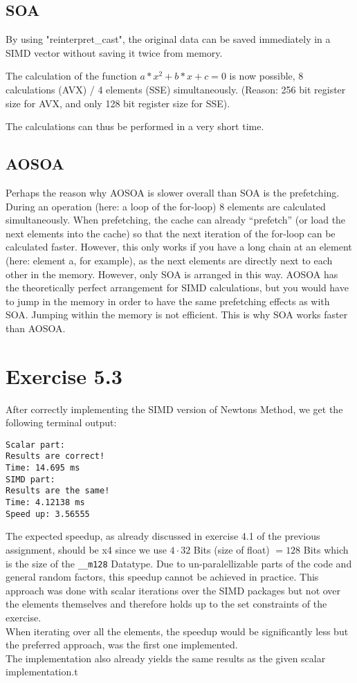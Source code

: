 \documentclass[a4paper]{article}
\begin{document}
\subsection*{SOA}
By using "reinterpret\_cast", the original data can be saved immediately in a SIMD vector without saving it twice from memory.

The calculation of the function $a*x^2 +b*x+c = 0$ is now possible, 8 calculations (AVX) / 4 elements (SSE) simultaneously. (Reason: 256 bit register size for AVX, and only 128 bit register size for SSE).

The calculations can thus be performed in a very short time.

\subsection*{AOSOA}
Perhaps the reason why AOSOA is slower overall than SOA is the prefetching. During an operation (here: a loop of the for-loop) 8 elements are calculated simultaneously. When prefetching, the cache can already “prefetch” (or load the next elements into the cache) so that the next iteration of the for-loop can be calculated faster. However, this only works if you have a long chain at an element (here: element a, for example), as the next elements are directly next to each other in the memory. However, only SOA is arranged in this way. AOSOA has the theoretically perfect arrangement for SIMD calculations, but you would have to jump in the memory in order to have the same prefetching effects as with SOA. Jumping within the memory is not efficient. This is why SOA works faster than AOSOA.

\section*{Exercise 5.3}
After correctly implementing the SIMD version of Newtons Method, we get the following terminal output:
\begin{verbatim}
Scalar part:
Results are correct!
Time: 14.695 ms
SIMD part:
Results are the same!
Time: 4.12138 ms
Speed up: 3.56555
\end{verbatim}
The expected speedup, as already discussed in exercise 4.1 of the previous assignment, should be x4 since we use $4 \cdot 32$ Bits (size of float) $= 128$ Bits which is the size of the \texttt{\_\_m128} Datatype. Due to un-paralellizable parts of the code and general random factors, this speedup cannot be achieved in practice. This approach was done with scalar iterations over the SIMD packages but not over the elements themselves and therefore holds up to the set constraints of the exercise.\\
When iterating over all the elements, the speedup would be significantly less but the preferred approach, was the first one implemented.\\
The implementation also already yields the same results as the given scalar implementation.t
\end{document}
